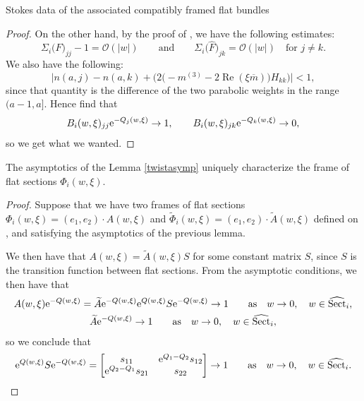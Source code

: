 \begin{subsubsection}{Stokes data of the associated compatibly framed flat bundles}
\begin{proof}
On the other hand, by the proof of \cite[Lemma 1]{B2}, we have the following estimates:
\[
\Sigma_i\bigl(\hat{F}\bigr)_{jj}-1=\mathcal{O}(|w|) \qquad \text{and}\qquad \Sigma_i\bigl(\hat{F}\bigr)_{jk}=\mathcal{O}(|w|) \quad \text{for $j\neq k$}.
\]
 We also have the following:
 \[
 \bigl|n(a,j)-n(a,k)+\bigl(2\bigl(-m^{(3)}-2\operatorname{Re}(\xi \overline{m})\bigr)H_{kk}\bigr)\bigr|<1,
 \]
 since that quantity is the difference of the two parabolic weights in the range $(a-1,a]$. Hence find that
\begin{equation*}
 B_i(w,\xi)_{jj}{\rm e}^{-Q_j(w,\xi)} \to 1, \qquad
 B_i(w,\xi)_{jk}{\rm e}^{-Q_k(w,\xi)} \to 0,
\end{equation*}
so we get what we wanted.
\end{proof}

\begin{Lemma}\label{UniqueA} The asymptotics of the Lemma {\rm\ref{twistasymp}} uniquely characterize the frame of flat sections $\Phi_i(w,\xi)$.
\end{Lemma}
\begin{proof}Suppose that we have two frames of flat sections $\Phi_i(w,\xi)=(e_1,e_2)\cdot A(w,\xi)$ and $\widetilde{\Phi}_i(w,\xi)=(e_1,e_2)\cdot \widetilde{A}(w,\xi)$ defined on , and satisfying the asymptotics of the previous lemma.

We then have that $A(w,\xi)=\widetilde{A}(w,\xi)S$ for some constant matrix $S$, since $S$ is the transition function between flat sections. From the asymptotic conditions, we then have that
\begin{gather*}
 A(w,\xi){\rm e}^{-Q(w,\xi)}=\widetilde{A}{\rm e}^{-Q(w,\xi)}{\rm e}^{Q(w,\xi)}S{\rm e}^{-Q(w,\xi)} \to 1 \qquad \text{as} \quad w \to 0,\quad w \in \widehat{\operatorname{Sect}}_i,\\
 \widetilde{A}{\rm e}^{-Q(w,\xi)}\to 1\qquad \text{as} \quad w \to 0,\quad w \in \widehat{\operatorname{Sect}}_i,
\end{gather*}
so we conclude that
\begin{equation*}
 {\rm e}^{Q(w,\xi)}S{\rm e}^{-Q(w,\xi)}=\begin{bmatrix} s_{11} & {\rm e}^{Q_1-Q_2}s_{12}\\
 {\rm e}^{Q_2-Q_1}s_{21} & s_{22}\\
 \end{bmatrix}\to 1 \qquad \text{as} \quad w \to 0,\quad w \in \widehat{\operatorname{Sect}}_i.
\end{equation*}


\end{proof}
\end{subsubsection}
